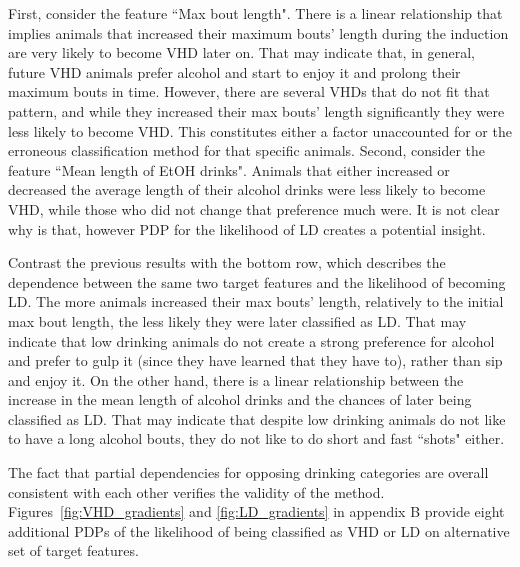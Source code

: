 	First, consider the feature ``Max bout length". There is a linear relationship that implies animals that increased their maximum bouts’ length during the induction are very likely to become VHD later on. That may indicate that, in general, future VHD animals prefer alcohol and start to enjoy it and prolong their maximum bouts in time. However, there are several VHDs that do not fit that pattern, and while they increased their max bouts' length significantly they were less likely to become VHD. This constitutes either a factor unaccounted for or the erroneous classification method for that specific animals. Second, consider the feature ``Mean length of EtOH drinks".  Animals that either increased or decreased the average length of their alcohol drinks were less likely to become VHD, while those who did not change that preference much were. It is not clear why is that, however PDP for the likelihood of LD creates a potential insight.
	
	Contrast the previous results with the bottom row, which describes the dependence between the same two target features and the likelihood of becoming LD. The more animals increased their max bouts' length, relatively to the initial max bout length, the less likely they were later classified as LD. That may indicate that low drinking animals do not create a strong preference for alcohol and prefer to gulp it (since they have learned that they have to), rather than sip and enjoy it. On the other hand, there is a linear relationship between the increase in the mean length of alcohol drinks and the chances of later being classified as LD. That may indicate that despite low drinking animals do not like to have a long alcohol bouts, they do not like to do short and fast ``shots" either. 
	
	The fact that partial dependencies for opposing drinking categories are overall consistent with each other verifies the validity of the method. Figures~\ref{fig:VHD_gradients} and \ref{fig:LD_gradients} in appendix B provide eight additional PDPs of the likelihood of being classified as VHD or LD on alternative set of target features.

	
